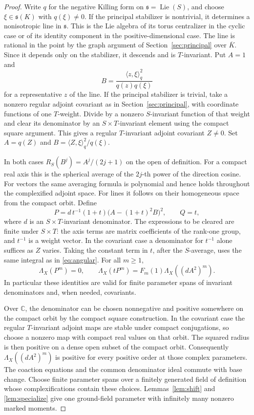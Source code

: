 \documentclass[11pt]{article}
\newcommand{\CC}{\mathbb C}
\newcommand{\Lie}{\operatorname{Lie}}
\begin{document}
\begin{proof}
Write \(q\) for the negative Killing form on \(\mathfrak s=\Lie(S)\),
and choose \(\xi\in\mathfrak s(K)\) with \(q(\xi)\ne0\).
If the principal stabilizer is nontrivial, it determines a
nonisotropic line in \(\mathfrak s\). This is the Lie algebra of
its torus centralizer in the cyclic case or of its identity
component in the positive-dimensional case. The line is rational
in the point by the graph argument of Section~\ref{sec:principal}
over \(\overline K\). Since it depends only on the stabilizer,
it descends and is \(T\)-invariant. Put \(A=1\) and
\[
                  B=\frac{\langle z,\xi\rangle_q^2}{q(z)q(\xi)}
\]
for a representative \(z\) of the line. If the principal stabilizer
is trivial, take a nonzero regular adjoint covariant as in
Section~\ref{sec:principal}, with coordinate functions of one
\(T\)-weight. Divide by a nonzero \(S\)-invariant function of that
weight and clear its denominator by an \(S\times T\)-invariant
element using the compact square argument. This gives a regular
\(T\)-invariant adjoint covariant \(Z\ne0\). Set \(A=q(Z)\) and
\(B=\langle Z,\xi\rangle_q^2/q(\xi)\).

In both cases \(R_S(B^j)=A^j/(2j+1)\) on the open of definition.
For a compact real axis this is the spherical average of the
\(2j\)-th power of the direction cosine. For vectors the same
averaging formula is polynomial and hence holds throughout the
complexified adjoint space. For lines it follows on their
homogeneous space from the compact orbit. Define
\[
 P=d\,t^{-1}(1+t)\bigl(A-(1+t)^2B\bigr)^2,\qquad Q=t,
\]
where \(d\) is an \(S\times T\)-invariant denominator. The
expressions to be cleared are finite under \(S\times T\):
the axis terms are matrix coefficients of the rank-one group,
and \(t^{-1}\) is a weight vector. In the covariant case a
denominator for \(t^{-1}\) alone suffices as \(Z\) varies.
Taking the constant term in \(t\), after the \(S\)-average,
uses the same integral as in \eqref{eq:angular}. For all \(m\ge1\),
\[
        \Lambda_X(P^m)=0,\qquad
        \Lambda_X(tP^m)=F_m(1)\Lambda_X((dA^2)^m).
\]
In particular these identities are valid for finite parameter
spans of invariant denominators and, when needed, covariants.

Over \(\CC\), the denominator can be chosen nonnegative and positive
somewhere on the compact orbit by the compact square construction.
In the covariant case the regular \(T\)-invariant adjoint maps
are stable under compact conjugations, so choose a nonzero map
with compact real values on that orbit. The squared radius is
then positive on a dense open subset of the compact orbit.
Consequently \(\Lambda_X((dA^2)^m)\) is positive for every
positive order at those complex parameters. The coaction equations
and the common denominator ideal commute with base change.
Choose finite parameter spans over a finitely generated field of
definition whose complexifications contain these choices.
Lemmas~\ref{lem:shift} and \ref{lem:specialize} give one ground-field
parameter with infinitely many nonzero marked moments.


\end{proof}
\end{document}
